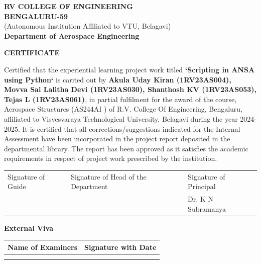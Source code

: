 \documentclass{book}
\begin{document}
\begin{center}
{\large \textbf{RV COLLEGE OF ENGINEERING}}\\
\vspace{0.25cm}
\textbf{BENGALURU-59}\\
\vspace{0.25cm}
{\small (Autonomous Institution Affiliated to VTU, Belagavi)}\\
\vspace{0.25cm}
{\large \textbf{Department of Aerospace Engineering}}

\vspace{1cm}
{\Large \textbf{CERTIFICATE}}
\end{center}

\vspace{1cm}

Certified that the experiential learning project work titled \textbf{`Scripting in ANSA using Python`} is carried out by \textbf{Akula Uday Kiran (1RV23AS004), Movva Sai Lalitha Devi (1RV23AS030), Shanthosh KV (1RV23AS053), Tejas L (1RV23AS061)}, in partial fulfilment for the award of the course, Aerospace Structures (AS244AI ) of R.V. College Of Engineering, Bengaluru, affiliated to Visvesvaraya Technological University, Belagavi during the year 2024-2025. It is certified that all corrections/suggestions indicated for the Internal Assessment have been incorporated in the project report deposited in the departmental library. The report has been approved as it satisfies the academic requirements in respect of project work prescribed by the institution.

\vspace{3cm}

\begin{tabular}{p{}p{}p{}}
Signature of Guide & Signature of Head of the Department & Signature of Principal \\
& & Dr. K N Subramanya \\
\end{tabular}

\vspace{2cm}

\textbf{External Viva}

\begin{tabular}{|p{}|p{}|}
\hline
Name of Examiners & Signature with Date \\
\hline
& \\
& \\
\hline
\end{tabular}
\end{document}
